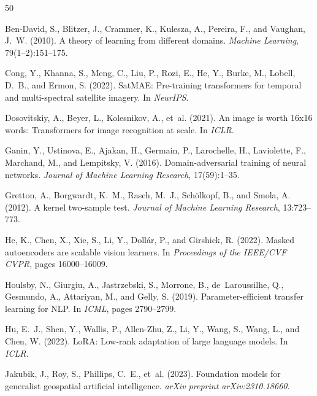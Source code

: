 \documentclass[11pt,a4paper]{report}
\begin{document}
\small
{}

\begin{thebibliography}{50}
\setlength{\itemsep}{1pt}

Ben-David, S., Blitzer, J., Crammer, K., Kulesza, A., Pereira, F., and Vaughan, J.~W. (2010).
A theory of learning from different domains.
\emph{Machine Learning}, 79(1--2):151--175.

Cong, Y., Khanna, S., Meng, C., Liu, P., Rozi, E., He, Y., Burke, M., Lobell, D.~B., and Ermon, S. (2022).
SatMAE: Pre-training transformers for temporal and multi-spectral satellite imagery.
In \emph{NeurIPS}.

Dosovitskiy, A., Beyer, L., Kolesnikov, A., et~al. (2021).
An image is worth 16x16 words: Transformers for image recognition at scale.
In \emph{ICLR}.

Ganin, Y., Ustinova, E., Ajakan, H., Germain, P., Larochelle, H., Laviolette, F., Marchand, M., and Lempitsky, V. (2016).
Domain-adversarial training of neural networks.
\emph{Journal of Machine Learning Research}, 17(59):1--35.

Gretton, A., Borgwardt, K.~M., Rasch, M.~J., Sch{\"o}lkopf, B., and Smola, A. (2012).
A kernel two-sample test.
\emph{Journal of Machine Learning Research}, 13:723--773.

He, K., Chen, X., Xie, S., Li, Y., Doll{\'a}r, P., and Girshick, R. (2022).
Masked autoencoders are scalable vision learners.
In \emph{Proceedings of the IEEE/CVF CVPR}, pages 16000--16009.

Houlsby, N., Giurgiu, A., Jastrzebski, S., Morrone, B., de~Laroussilhe, Q., Gesmundo, A., Attariyan, M., and Gelly, S. (2019).
Parameter-efficient transfer learning for NLP.
In \emph{ICML}, pages 2790--2799.

Hu, E.~J., Shen, Y., Wallis, P., Allen-Zhu, Z., Li, Y., Wang, S., Wang, L., and Chen, W. (2022).
LoRA: Low-rank adaptation of large language models.
In \emph{ICLR}.

Jakubik, J., Roy, S., Phillips, C.~E., et~al. (2023).
Foundation models for generalist geospatial artificial intelligence.
\emph{arXiv preprint arXiv:2310.18660}.


\end{thebibliography}
\end{document}
